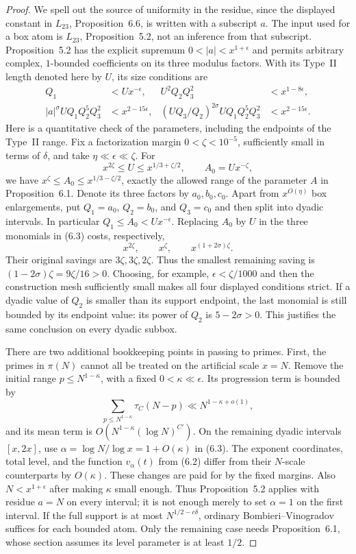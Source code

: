 \begin{proof}
We spell out the source of uniformity in the residue, since the
displayed constant in $L_{23}$, Proposition~6.6, is written with
a subscript $a$. The input used for a box atom is $L_{23}$,
Proposition~5.2, not an inference from that subscript. Proposition~5.2
has the explicit supremum $0<|a|<x^{1+\epsilon}$ and permits arbitrary
complex, $1$-bounded coefficients on its three modulus factors.
With its Type~II length denoted here by $U$, its size conditions are
\begin{align*}
 Q_1&<Ux^{-\epsilon},&
 U^2Q_2Q_3^2&<x^{1-8\epsilon},\\
 |a|^\sigma UQ_1Q_2^5Q_3^2&<x^{2-15\epsilon},&
 (UQ_3/Q_2)^{2\sigma}UQ_1Q_2^5Q_3^2
     &<x^{2-15\epsilon}.
\end{align*}
Here is a quantitative check of the parameters, including the
endpoints of the Type~II range. Fix a factorization margin
$0<\zeta<10^{-5}$, sufficiently small in terms of $\delta$, and take
$\eta\ll\epsilon\ll\zeta$. For
\[
 x^{2\zeta}\le U\le x^{1/3+\zeta/2},\qquad A_0=Ux^{-\zeta},
\]
we have $x^\zeta\le A_0\le x^{1/3-\zeta/2}$, exactly the allowed
range of the parameter $A$ in Proposition~6.1. Denote its three
factors by $a_0,b_0,c_0$. Apart from $x^{O(\eta)}$ box enlargements,
put $Q_1=a_0$, $Q_2=b_0$, and $Q_3=c_0$ and then split into dyadic
intervals. In particular $Q_1\le A_0<Ux^{-\epsilon}$.
Replacing $A_0$ by $U$ in the three monomials in (6.3) costs,
respectively,
\[
 x^{2\zeta},\qquad x^\zeta,\qquad
 x^{(1+2\sigma)\zeta}.
\]
Their original savings are $3\zeta,3\zeta,2\zeta$.
Thus the smallest remaining saving is
$(1-2\sigma)\zeta=9\zeta/16>0$.
Choosing, for example, $\epsilon<\zeta/1000$ and then the construction
mesh sufficiently small makes all four displayed conditions strict.
If a dyadic value of $Q_2$ is smaller than its support endpoint,
the last monomial is still bounded by its endpoint value: its power
of $Q_2$ is $5-2\sigma>0$. This justifies the same conclusion on
every dyadic subbox.

There are two additional bookkeeping points in passing to primes.
First, the primes in $\pi(N)$ cannot all be treated on the artificial
scale $x=N$. Remove the initial range $p\le N^{1-\kappa}$, with a
fixed $0<\kappa\ll\epsilon$. Its progression term is bounded by
\[
 \sum_{p\le N^{1-\kappa}}\tau_C(N-p)
       \ll N^{1-\kappa+o(1)},
\]
and its mean term is $O(N^{1-\kappa}(\log N)^{C'})$.
On the remaining dyadic intervals $[x,2x]$, use
$\alpha=\log N/\log x=1+O(\kappa)$ in (6.3).
The exponent coordinates, total level, and the function
$v_\alpha(t)$ from (6.2) differ from their $N$-scale counterparts
by $O(\kappa)$. These changes are paid for by the fixed margins.
Also $N<x^{1+\epsilon}$ after making $\kappa$ small enough.
Thus Proposition~5.2 applies with residue $a=N$ on every interval;
it is not enough merely to set $\alpha=1$ on the first interval.
If the full support is at most $N^{1/2-c\delta}$, ordinary
Bombieri--Vinogradov suffices for each bounded atom. Only the
remaining case needs Proposition~6.1, whose section assumes its
level parameter is at least $1/2$.


\end{proof}
